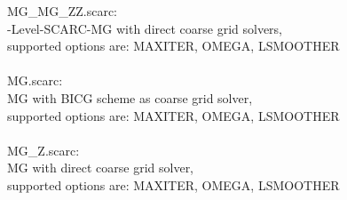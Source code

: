 \begin{tabbing}
MG\_MG\_ZZ.scarc:\\
-Level-SCARC-MG with direct coarse grid solvers,\\
\> supported options are: MAXITER, OMEGA, LSMOOTHER\\
\\

MG.scarc:\\
\> MG with BICG scheme as coarse grid solver,\\
\> supported options are: MAXITER, OMEGA, LSMOOTHER\\
\\

MG\_Z.scarc:\\
\> MG with direct coarse grid solver,\\
\> supported options are: MAXITER, OMEGA, LSMOOTHER\\
\\
\end{tabbing}
